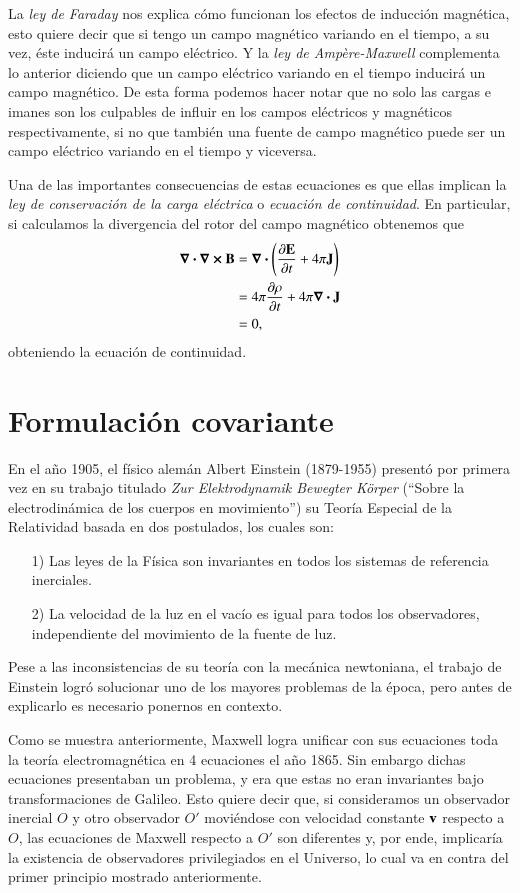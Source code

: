 La \textit{ley de Faraday} nos explica cómo funcionan los efectos de inducción magnética, esto quiere decir que si tengo un campo magnético variando en el tiempo, a su vez, éste inducirá un campo eléctrico.  Y la \textit{ley de Ampère-Maxwell} complementa lo anterior diciendo que un campo eléctrico variando en el tiempo inducirá un campo magnético. De esta forma podemos hacer notar que no solo las cargas e imanes son los culpables de influir en los campos eléctricos y magnéticos respectivamente, si no que también una fuente de campo magnético puede ser un campo eléctrico variando en el tiempo y viceversa.

Una de las importantes consecuencias de estas ecuaciones es que ellas implican la \textit{ley de conservación de la carga eléctrica} o \textit{ecuación de continuidad}. En particular, si calculamos la divergencia del rotor del campo magnético obtenemos que
\begin{align}
\div{\curl{\vb{B}}} &= \div{ \left( \pdv{\vb{E}}{t} + 4\pi \vb{J} \right) }\\
&= 4\pi \pdv{\rho}{t} + 4\pi \div{\vb{J}}\\
&= 0,
\end{align}
obteniendo la ecuación de continuidad.

\section{Formulación covariante}

En el año 1905, el físico alemán Albert Einstein (1879-1955) presentó por primera vez en su trabajo titulado \textit{Zur Elektrodynamik Bewegter Körper} \cite{Einstein} (``Sobre la electrodinámica de los cuerpos en movimiento'') su Teoría Especial de la Relatividad basada en dos postulados, los cuales son:
\begin{itemize}
\item[1)] Las leyes de la Física son invariantes en todos los sistemas de referencia inerciales.
\item[2)] La velocidad de la luz en el vacío es igual para todos los observadores, independiente del movimiento de la fuente de luz.
\end{itemize}

Pese a las inconsistencias de su teoría con la mecánica newtoniana, el trabajo de Einstein logró solucionar uno de los mayores problemas de la época, pero antes de explicarlo es necesario ponernos en contexto.

Como se muestra anteriormente, Maxwell logra unificar con sus ecuaciones toda la teoría electromagnética en 4 ecuaciones el año 1865. Sin embargo dichas ecuaciones presentaban un problema, y era que estas no eran invariantes bajo transformaciones de Galileo. Esto quiere decir que, si consideramos un observador inercial $O$ y otro observador $O'$ moviéndose con velocidad constante $\vb{v}$ respecto a $O$, las ecuaciones de Maxwell respecto a $O'$ son diferentes y, por ende, implicaría la existencia de observadores privilegiados en el Universo, lo cual va en contra del primer principio mostrado anteriormente. 

